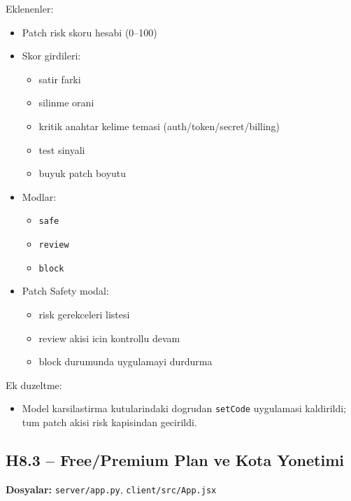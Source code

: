 \documentclass[12pt,a4paper]{article}
\begin{document}
Eklenenler:
\begin{itemize}[leftmargin=*]
  \item Patch risk skoru hesabi (0--100)
  \item Skor girdileri:
  \begin{itemize}[leftmargin=*]
    \item satir farki
    \item silinme orani
    \item kritik anahtar kelime temasi (auth/token/secret/billing)
    \item test sinyali
    \item buyuk patch boyutu
  \end{itemize}
  \item Modlar:
  \begin{itemize}[leftmargin=*]
    \item \texttt{safe}
    \item \texttt{review}
    \item \texttt{block}
  \end{itemize}
  \item Patch Safety modal:
  \begin{itemize}[leftmargin=*]
    \item risk gerekceleri listesi
    \item review akisi icin kontrollu devam
    \item block durumunda uygulamayi durdurma
  \end{itemize}
\end{itemize}

Ek duzeltme:
\begin{itemize}[leftmargin=*]
  \item Model karsilastirma kutularindaki dogrudan \texttt{setCode} uygulamasi kaldirildi; tum patch akisi risk kapisindan gecirildi.
\end{itemize}

\subsection{H8.3 -- Free/Premium Plan ve Kota Yonetimi}
\textbf{Dosyalar:} \texttt{server/app.py}, \texttt{client/src/App.jsx}
\end{document}
